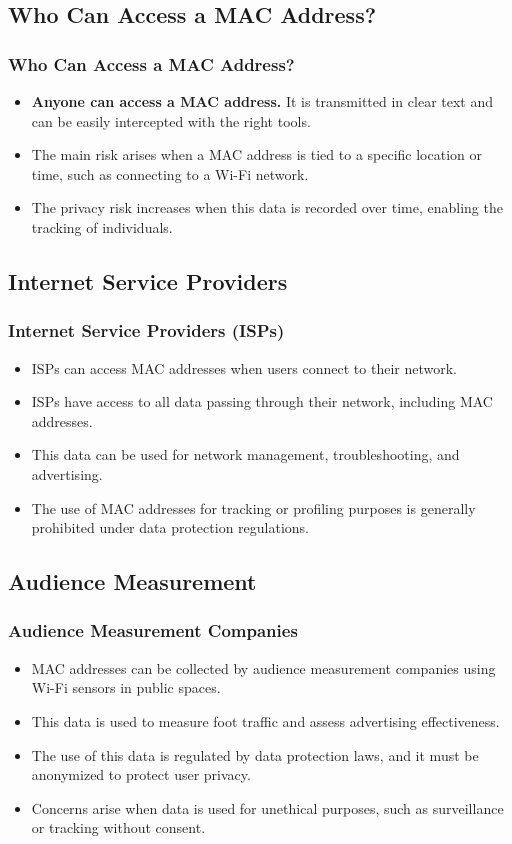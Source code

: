 \documentclass[
english,
svgnames,
notes=hide,
12pt]{beamer}
\begin{document}
\begin{frame}
  \section{Who Can Access a MAC Address?}
  \frametitle{Who Can Access a MAC Address?}
  \begin{itemize}
    \item \textbf{Anyone can access a MAC address.} It is transmitted in clear text and can be easily intercepted with the right tools. \pause
    \item The main risk arises when a MAC address is tied to a specific location or time, such as connecting to a Wi-Fi network. \pause
    \item The privacy risk increases when this data is recorded over time, enabling the tracking of individuals. 
  \end{itemize}
\end{frame}

\begin{frame}
  \section{Internet Service Providers}
  \frametitle{Internet Service Providers (ISPs)}
  \begin{itemize}
    \item ISPs can access MAC addresses when users connect to their network. \pause
    \item ISPs have access to all data passing through their network, including MAC addresses. \pause
    \item This data can be used for network management, troubleshooting, and advertising. \pause
    \item The use of MAC addresses for tracking or profiling purposes is generally prohibited under data protection regulations. 
  \end{itemize}
\end{frame}

\begin{frame}
  \section{Audience Measurement}
  \frametitle{Audience Measurement Companies}
  \begin{itemize}
    \item MAC addresses can be collected by audience measurement companies using Wi-Fi sensors in public spaces. \pause
    \item This data is used to measure foot traffic and assess advertising effectiveness. \pause
    \item The use of this data is regulated by data protection laws, and it must be anonymized to protect user privacy. \pause
    \item Concerns arise when data is used for unethical purposes, such as surveillance or tracking without consent. 
  \end{itemize}
\end{frame}
\end{document}
